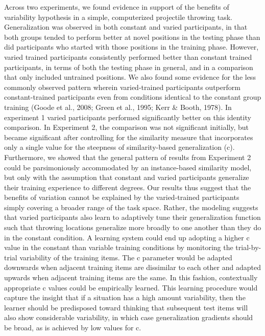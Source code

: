 \documentclass[
  man,floatsintext]{apa7}
\begin{document}
Across two experiments, we found evidence in support of the benefits of variability hypothesis in a simple, computerized projectile throwing task. Generalization was observed in both constant and varied participants, in that both groups tended to perform better at novel positions in the testing phase than did participants who started with those positions in the training phase. However, varied trained participants consistently performed better than constant trained participants, in terms of both the testing phase in general, and in a comparison that only included untrained positions. We also found some evidence for the less commonly observed pattern wherein varied-trained participants outperform constant-trained participants even from conditions identical to the constant group training (Goode et al., 2008; Green et al., 1995; Kerr \& Booth, 1978). In experiment 1 varied participants performed significantly better on this identity comparison. In Experiment 2, the comparison was not significant initially, but became significant after controlling for the similarity measure that incorporates only a single value for the steepness of similarity-based generalization (c). Furthermore, we showed that the general pattern of results from Experiment 2 could be parsimoniously accommodated by an instance-based similarity model, but only with the assumption that constant and varied participants generalize their training experience to different degrees. Our results thus suggest that the benefits of variation cannot be explained by the varied-trained participants simply covering a broader range of the task space. Rather, the modeling suggests that varied participants also learn to adaptively tune their generalization function such that throwing locations generalize more broadly to one another than they do in the constant condition. A learning system could end up adopting a higher c value in the constant than variable training conditions by monitoring the trial-by-trial variability of the training items. The c parameter would be adapted downwards when adjacent training items are dissimilar to each other and adapted upwards when adjacent training items are the same. In this fashion, contextually appropriate c values could be empirically learned. This learning procedure would capture the insight that if a situation has a high amount variability, then the learner should be predisposed toward thinking that subsequent test items will also show considerable variability, in which case generalization gradients should be broad, as is achieved by low values for c.
\end{document}
